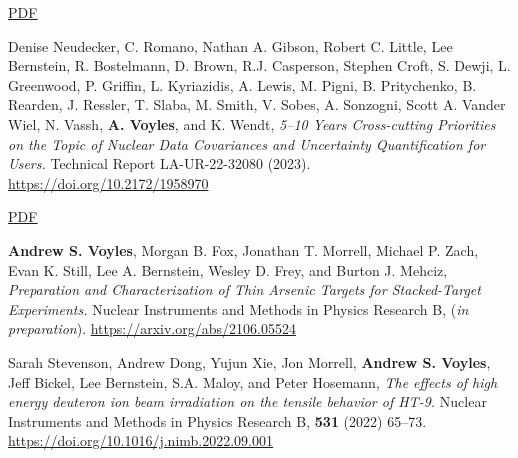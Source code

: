 \begin{bibsection}
\ifshort \vspace{0.1cm} \href{https://avoyles.github.io/papers/Pogliano2023_166Ho.pdf}{\underline{PDF}} \else  \fi



\item Denise Neudecker, C. Romano, Nathan A. Gibson, Robert C. Little, Lee Bernstein, R. Bostelmann, D. Brown, R.J. Casperson, Stephen Croft, S. Dewji, L. Greenwood, P. Griffin, L. Kyriazidis, A. Lewis, M. Pigni, B. Pritychenko, B. Rearden, J. Ressler, T. Slaba, M. Smith, V. Sobes, A. Sonzogni, Scott A. Vander Wiel, N. Vassh, \textbf{A.  Voyles}, and K. Wendt, \emph{5--10 Years Cross-cutting Priorities on the Topic of Nuclear Data Covariances and Uncertainty Quantification for Users.} Technical Report LA-UR-22-32080  (2023). \url{https://doi.org/10.2172/1958970} 

\ifshort \vspace{0.1cm} \href{https://avoyles.github.io/papers/Neudecker2023_UQ_Short.pdf}{\underline{PDF}} \else  \fi 



\item \textbf{Andrew S. Voyles}, Morgan B. Fox, Jonathan T. Morrell, Michael P. Zach, Evan K. Still, Lee A. Bernstein, Wesley D. Frey, and Burton J. Mehciz, \emph{Preparation and Characterization of Thin Arsenic Targets for Stacked-Target Experiments.} Nuclear Instruments and Methods in Physics Research  B,  (\emph{in preparation}). \url{https://arxiv.org/abs/2106.05524} 










\item Sarah Stevenson, Andrew Dong, Yujun Xie, Jon Morrell, \textbf{Andrew S. Voyles}, Jeff Bickel, Lee Bernstein, S.A. Maloy, and Peter Hosemann, \emph{The effects of high energy deuteron ion beam irradiation on the tensile behavior of HT-9.} Nuclear Instruments and Methods in Physics Research  B, \textbf{531} (2022) 65--73. \url{https://doi.org/10.1016/j.nimb.2022.09.001} 


\end{bibsection}
